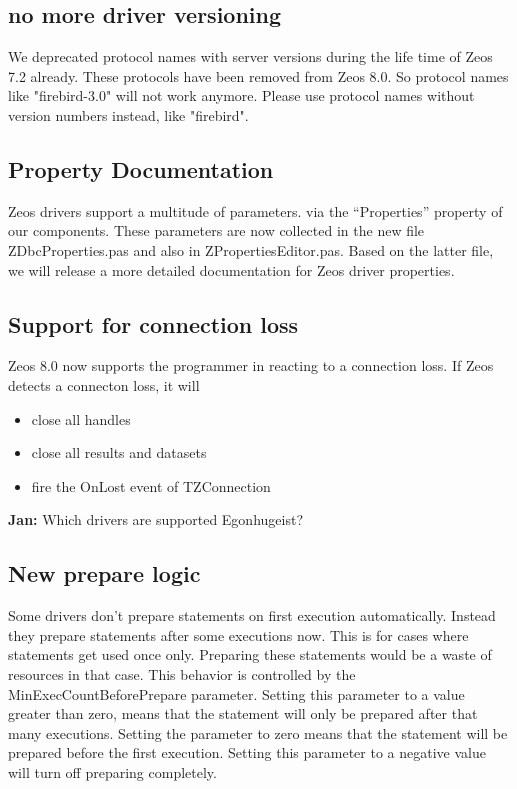 \documentclass[a4paper,12pt,oneside]{article}
\begin{document}
\subsection{no more driver versioning}
We deprecated protocol names with server versions during the life time of Zeos 7.2 already.
These protocols have been removed from Zeos 8.0.
So protocol names like "firebird-3.0" will not work anymore.
Please use protocol names without version numbers instead, like "firebird".

\subsection{Property Documentation}
Zeos drivers support a multitude of parameters. via the "`Properties"' property of our components.
These parameters are now collected in the new file ZDbcProperties.pas and also in ZPropertiesEditor.pas.
Based on the latter file, we will release a more detailed documentation for Zeos driver properties.

\subsection{Support for connection loss}
Zeos 8.0 now supports the programmer in reacting to a connection loss.
If Zeos detects a connecton loss, it will
\begin{itemize}
	\item close all handles
	\item close all results and datasets
	\item fire the OnLost event of TZConnection
\end{itemize}

\textbf{Jan:} Which drivers are supported Egonhugeist?

\subsection{New prepare logic}
\label{subsec:NewPrepareLogic}
Some drivers don't prepare statements on first execution automatically.
Instead they prepare statements after some executions now.
This is for cases where statements get used once only.
Preparing these statements would be a waste of resources in that case.
This behavior is controlled by the MinExecCountBeforePrepare parameter.
Setting this parameter to a value greater than zero, means that the statement will only be prepared after that many executions.
Setting the parameter to zero means that the statement will be prepared before the first execution.
Setting this parameter to a negative value will turn off preparing completely.
\end{document}
